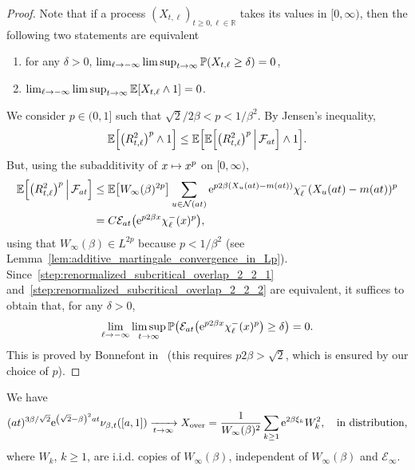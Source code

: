 \documentclass[AHL,Unicode,longabstracts,published]{cedram}
\newcommand{\rover}{\mathrm{over}}
\newcommand{\e}{\mathrm{e}}
\newcommand{\E}{\mathbb{E}}
\renewcommand{\P}{\mathbb{P}}
\newcommand{\R}{\mathbb{R}}
\newcommand\1{\mathds{1}}
\newcommand{\cE}{\mathcal{E}}
\newcommand{\cF}{\mathcal{F}}
\newcommand{\cN}{\mathcal{N}}
\newcommand{\Expec}[1]{\mathbb{E}\left[#1\right]}
\newcommand*{\relabel}{\renewcommand{\labelenumi}{(\theenumi)}}
\newcommand*{\romanenumi}{\renewcommand*{\theenumi}{\roman{enumi}}\relabel}
\let\originalleft\left
\let\originalright\right
\renewcommand{\left}{\mathopen{}\mathclose\bgroup\originalleft}
\renewcommand{\right}{\aftergroup\egroup\originalright}
\renewcommand*{\to}{\mathchoice{\longrightarrow}{\rightarrow}{\rightarrow}{\rightarrow}}
\let\oldmapsto\mapsto
\renewcommand*{\mapsto}{\mathchoice{\longmapsto}{\oldmapsto}{\oldmapsto}{\oldmapsto}}
\begin{document}
\begin{proof}
Note that if a process $(X_{t, \ell})_{t \geq 0, \ell \in \R}$ takes its values in $[0, \infty)$, then the following two statements are equivalent
\begin{enumerate}\romanenumi
\item\label{step:renormalized_subcritical_overlap_2_2_1}
for any $\delta > 0$, $\lim_{\ell \to -\infty} \limsup_{t \to \infty} \P(X_{t, \ell} \geq \delta) = 0$,
\item\label{step:renormalized_subcritical_overlap_2_2_2}
$\lim_{\ell \to -\infty} \limsup_{t \to \infty} \Expec{X_{t, \ell} \wedge 1} = 0$.
\end{enumerate}
We consider $p \in (0,1]$ such that $\sqrt{2}/2\beta < p < 1/\beta^2$. By Jensen's inequality,
\begin{equation*}
\Expec{\left(R_{t, \ell}^2\right)^p \wedge 1} \leq \Expec{\E \left[\left(R_{t, \ell}^2\right)^p \,\middle|\, \cF_{at} \right] \wedge 1}.
\end{equation*}
But, using the subadditivity of $x \mapsto x^p$ on $[0, \infty)$,
\begin{align*}
\E \left[\left(R_{t, \ell}^2\right)^p \,\middle|\, \cF_{at} \right] & \leq \Expec{W_\infty(\beta)^{2p}} \sum_{u \in \cN(at)} \e^{p2 \beta(X_u(at) - m(at))} \chi_\ell^-(X_u(at) - m(at))^p \\
& = C \cE_{at}\left(\e^{p2 \beta x} \chi_\ell^-(x)^p\right),
\end{align*}
using that $W_\infty(\beta) \in L^{2p}$ because $p < 1/\beta^2$ (see Lemma~\ref{lem:additive_martingale_convergence_in_Lp}). Since~\eqref{step:renormalized_subcritical_overlap_2_2_1} and~\eqref{step:renormalized_subcritical_overlap_2_2_2} are equivalent, it suffices to obtain that, for any $\delta > 0$,
\begin{equation*}
\lim_{\ell \to -\infty} \limsup_{t \to \infty} \P\left(\cE_{at}\left(\e^{p2 \beta x} \chi_\ell^-(x)^p\right) \geq \delta\right) = 0.
\end{equation*}
This is proved by Bonnefont in~\cite[Proposition~A.2]{Bonnefont2022} (this requires $p2\beta > \sqrt{2}$, which is ensured by our choice of $p$).
\end{proof}

\begin{lemm}\label{lem:renormalized_subcritical_overlap_limit}
We have
\begin{equation*}
(at)^{3 \beta/\sqrt{2}} \e^{\left(\sqrt{2} - \beta\right)^2 at} \nu_{\beta, t}([a, 1]) \xrightarrow[t \to \infty]{} X_{\rover} = \frac{1}{W_\infty(\beta)^2} \sum_{k \geq 1} \e^{2 \beta \xi_k} W_k^2, \quad \text{in distribution},
\end{equation*}
where $W_k$, $k \geq 1$, are i.i.d. copies of $W_\infty(\beta)$, independent of $W_\infty(\beta)$ and $\cE_\infty$.
\end{lemm}
\end{document}
